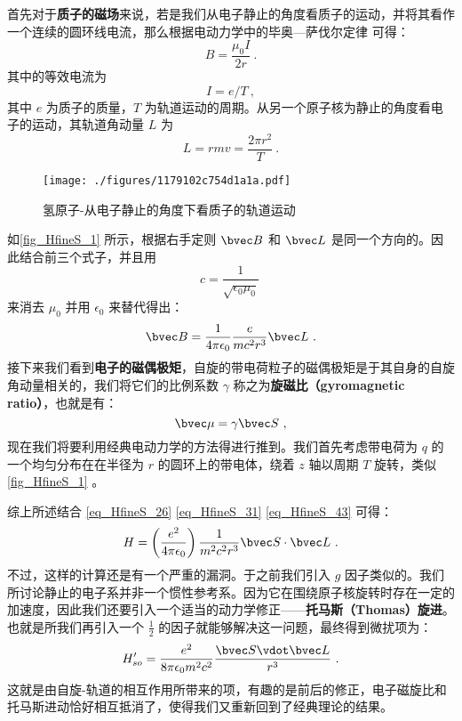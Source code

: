 首先对于\textbf{质子的磁场}来说，若是我们从电子静止的角度看质子的运动，并将其看作一个连续的圆环线电流，那么根据电动力学中的毕奥—萨伐尔定律 可得：
\begin{equation}
B=\frac{\mu_0I}{2r}~.
\end{equation}
其中的等效电流为
\begin{equation}
I=e/T~,
\end{equation}
其中 $e$ 为质子的质量，$T$ 为轨道运动的周期。从另一个原子核为静止的角度看电子的运动，其轨道角动量 $L$ 为
\begin{equation}
L=rmv=\frac{2\pi r^2}{T}~.
\end{equation}
\begin{figure}[ht]
\centering
\texttt{[image: ./figures/1179102c754d1a1a.pdf]}
\caption{氢原子-从电子静止的角度下看质子的轨道运动} \label{fig_HfineS_1}
\end{figure}
如\autoref{fig_HfineS_1} 所示，根据右手定则 $\bvec B$ 和 $\bvec L$ 是同一个方向的。因此结合前三个式子，并且用
\begin{equation}
c=\frac{1}{\sqrt{\epsilon_0\mu_0}}~
\end{equation}
来消去 $\mu_0$ 并用 $\epsilon_0$ 来替代得出：
\begin{equation}\label{eq_HfineS_31}
\bvec B = \frac{1}{4\pi\epsilon_0}\frac{e}{mc^2r^3}\bvec L~.
\end{equation}
接下来我们看到\textbf{电子的磁偶极矩}，自旋的带电荷粒子的磁偶极矩是于其自身的自旋角动量相关的，我们将它们的比例系数 $\gamma$ 称之为\textbf{旋磁比（gyromagnetic
ratio）}，也就是有：
\begin{equation}
\bvec\mu=\gamma\bvec S~,
\end{equation}
现在我们将要利用经典电动力学的方法得进行推到。我们首先考虑带电荷为 $q$ 的一个均匀分布在在半径为 $r$ 的圆环上的带电体，绕着 $z$ 轴以周期 $T$ 旋转，类似\autoref{fig_HfineS_1} 。


综上所述结合 \autoref{eq_HfineS_26} \autoref{eq_HfineS_31} \autoref{eq_HfineS_43} 可得：
\begin{equation}
H=\left(\frac{e^2}{4\pi\epsilon_0}\right)\frac{1}{m^2c^2r^3}\bvec S \cdot \bvec L~.
\end{equation}
不过，这样的计算还是有一个严重的漏洞。于之前我们引入 $g$ 因子类似的。我们所讨论静止的电子系并非一个惯性参考系。因为它在围绕原子核旋转时存在一定的加速度，因此我们还要引入一个适当的动力学修正——\textbf{托马斯（Thomas）旋进}。也就是所我们再引入一个 $\frac{1}{2}$ 的因子就能够解决这一问题，最终得到微扰项为：
\begin{equation}
H'_{so} = \frac{e^2}{8\pi \epsilon_0 m^2 c^2} \frac{\bvec S \vdot \bvec L}{r^3}~.
\end{equation}
这就是由自旋-轨道的相互作用所带来的项，有趣的是前后的修正，电子磁旋比和托马斯进动恰好相互抵消了，使得我们又重新回到了经典理论的结果。


